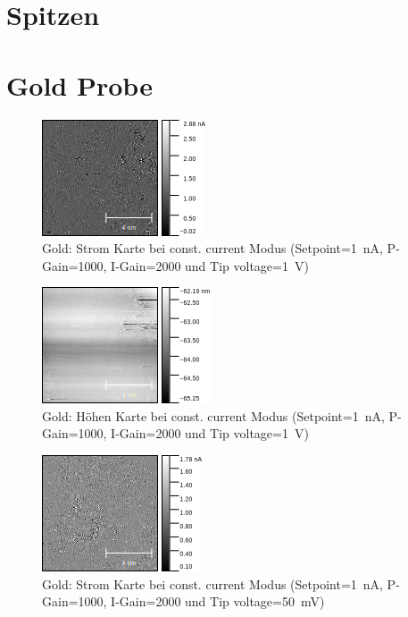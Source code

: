 \documentclass[sn-mathphys-num,iicol]{sn-jnl}
\theoremstyle{thmstyleone}
\theoremstyle{thmstyletwo}
\theoremstyle{thmstylethree}
\begin{document}
\section{Spitzen}
\section{Gold Probe}
\begin{figure}[t]
        \centering
        \includegraphics[width=.5\textwidth]{../data/Gold_10nm_current.png}
        \caption{Gold: Strom Karte bei const. current Modus (Setpoint=\SI{1}{\nano A}, P-Gain=\SI{1000}{}, I-Gain=\SI{2000}{} und Tip voltage=\SI{1}{V})} \label{fig:g10nmc}
\end{figure}
\begin{figure}[t]
        \centering
        \includegraphics[width=.5\textwidth]{../data/Gold_10nm_z.png}
        \caption{Gold: Höhen Karte bei const. current Modus (Setpoint=\SI{1}{\nano A}, P-Gain=\SI{1000}{}, I-Gain=\SI{2000}{} und Tip voltage=\SI{1}{V})} \label{fig:g10nmz}
\end{figure}
\begin{figure}[t]
        \centering
        \includegraphics[width=.5\textwidth]{../data/Gold_10nm_50mV_current.png}
        \caption{Gold: Strom Karte bei const. current Modus (Setpoint=\SI{1}{\nano A}, P-Gain=\SI{1000}{}, I-Gain=\SI{2000}{} und Tip voltage=\SI{50}{\milli V})} \label{fig:g10nm50mVc}
\end{figure}
\end{document}
